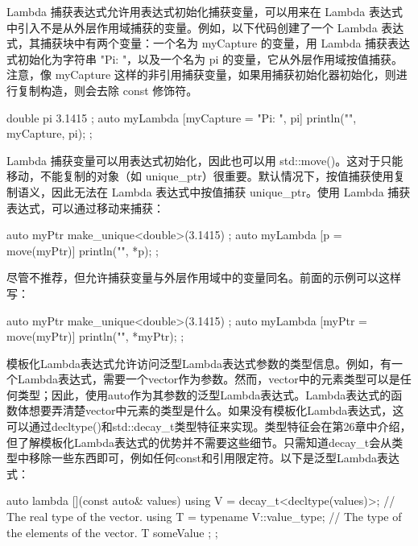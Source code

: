 
Lambda 捕获表达式允许用表达式初始化捕获变量，可以用来在 Lambda 表达式中引入不是从外层作用域捕获的变量。例如，以下代码创建了一个 Lambda 表达式，其捕获块中有两个变量：一个名为 myCapture 的变量，用 Lambda 捕获表达式初始化为字符串 "Pi: "，以及一个名为 pi 的变量，它从外层作用域按值捕获。注意，像 myCapture 这样的非引用捕获变量，如果用捕获初始化器初始化，则进行复制构造，则会去除 const 修饰符。

\begin{cpp}
double pi { 3.1415 };
auto myLambda { [myCapture = "Pi: ", pi]{ println("{}{}", myCapture, pi); } };
\end{cpp}

Lambda 捕获变量可以用表达式初始化，因此也可以用 std::move()。这对于只能移动，不能复制的对象（如 unique\_ptr）很重要。默认情况下，按值捕获使用复制语义，因此无法在 Lambda 表达式中按值捕获 unique\_ptr。使用 Lambda 捕获表达式，可以通过移动来捕获：

\begin{cpp}
auto myPtr { make_unique<double>(3.1415) };
auto myLambda { [p = move(myPtr)]{ println("{}", *p); } };
\end{cpp}

尽管不推荐，但允许捕获变量与外层作用域中的变量同名。前面的示例可以这样写：

\begin{cpp}
auto myPtr { make_unique<double>(3.1415) };
auto myLambda { [myPtr = move(myPtr)]{ println("{}", *myPtr); } };
\end{cpp}



模板化Lambda表达式允许访问泛型Lambda表达式参数的类型信息。例如，有一个Lambda表达式，需要一个vector作为参数。然而，vector中的元素类型可以是任何类型；因此，使用auto作为其参数的泛型Lambda表达式。Lambda表达式的函数体想要弄清楚vector中元素的类型是什么。如果没有模板化Lambda表达式，这可以通过decltype()和std::decay\_t类型特征来实现。类型特征会在第26章中介绍，但了解模板化Lambda表达式的优势并不需要这些细节。只需知道decay\_t会从类型中移除一些东西即可，例如任何const和引用限定符。以下是泛型Lambda表达式：

\begin{cpp}
auto lambda { [](const auto& values) {
        using V = decay_t<decltype(values)>; // The real type of the vector.
        using T = typename V::value_type; // The type of the elements of the vector.
        T someValue { };
} };
\end{cpp}

